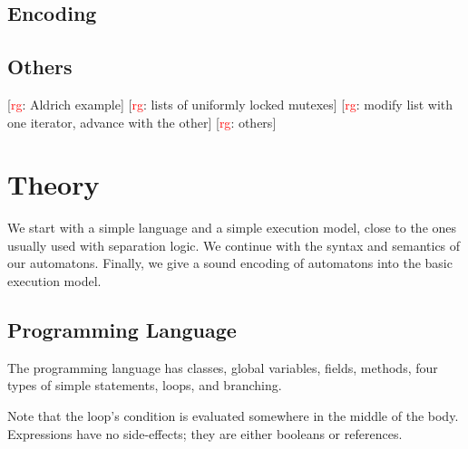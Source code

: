 \documentclass[a4paper]{article}
\newcommand{\todo}[2]{{\small [\textcolor{red}{#1}: #2]}}
\newcommand{\rg}[1]{\todo{rg}{#1}}
\theoremstyle{remark}
\begin{document}
\subsection{Encoding} %



\subsection{Others} %

\rg{Aldrich example}
\rg{lists of uniformly locked mutexes}
\rg{modify list with one iterator, advance with the other}
\rg{others}

\section{Theory} %

We start with a simple language and a simple execution model, close to the ones usually used with separation logic.
We continue with the syntax and semantics of our automatons.
Finally, we give a sound encoding of automatons into the basic execution model.

\subsection{Programming Language} %

The programming language has classes, global variables, fields, methods, four types of simple statements, loops, and branching.


\noindent Note that the loop's condition is evaluated somewhere in the middle of the body.
Expressions have no side-effects; they are either booleans or references.

\end{document}
